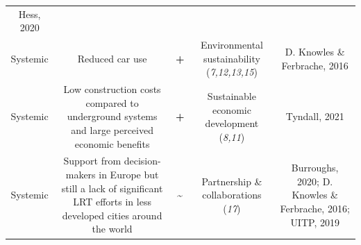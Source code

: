 \documentclass[
]{book}
\begin{document}
\begin{longtable}[]{@{}ccccc@{}}
\begin{minipage}[t]{0.17\columnwidth}
Hess, 2020\strut
\end{minipage}\tabularnewline
\begin{minipage}[t]{0.17\columnwidth}\centering
Systemic\strut
\end{minipage} & \begin{minipage}[t]{0.16\columnwidth}\centering
Reduced car use\strut
\end{minipage} & \begin{minipage}[t]{0.17\columnwidth}\centering
\textbf{+}\strut
\end{minipage} & \begin{minipage}[t]{0.17\columnwidth}\centering
Environmental sustainability (\emph{7,12,13,15})\strut
\end{minipage} & \begin{minipage}[t]{0.17\columnwidth}\centering
D. Knowles \& Ferbrache, 2016\strut
\end{minipage}\tabularnewline
\begin{minipage}[t]{0.17\columnwidth}\centering
Systemic\strut
\end{minipage} & \begin{minipage}[t]{0.16\columnwidth}\centering
Low construction costs compared to underground systems and large perceived economic benefits\strut
\end{minipage} & \begin{minipage}[t]{0.17\columnwidth}\centering
\textbf{+}\strut
\end{minipage} & \begin{minipage}[t]{0.17\columnwidth}\centering
Sustainable economic development (\emph{8,11})\strut
\end{minipage} & \begin{minipage}[t]{0.17\columnwidth}\centering
Tyndall, 2021\strut
\end{minipage}\tabularnewline
\begin{minipage}[t]{0.17\columnwidth}\centering
Systemic\strut
\end{minipage} & \begin{minipage}[t]{0.16\columnwidth}\centering
Support from decision-makers in Europe but still a lack of significant LRT efforts in less developed cities around the world\strut
\end{minipage} & \begin{minipage}[t]{0.17\columnwidth}\centering
\textbf{\textasciitilde{}}\strut
\end{minipage} & \begin{minipage}[t]{0.17\columnwidth}\centering
Partnership \& collaborations (\emph{17})\strut
\end{minipage} & \begin{minipage}[t]{0.17\columnwidth}\centering
Burroughs, 2020; D. Knowles \& Ferbrache, 2016; UITP, 2019\strut
\end{minipage}\tabularnewline
\bottomrule
\end{longtable}
\end{document}
